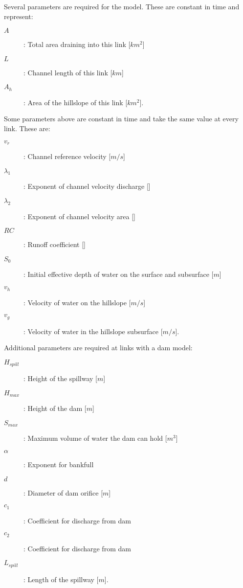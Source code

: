 \documentclass[12pt]{article}
\begin{document}
Several parameters are required for the model. These are constant in time and represent:
\begin{description}
 \item[$A$]: Total area draining into this link [$km^2$]
 \item[$L$]: Channel length of this link [$km$]
 \item[$A_h$]: Area of the hillslope of this link [$km^2$].
\end{description}
Some parameters above are constant in time and take the same value at every link. These are:
\begin{description}
 \item[$v_r$]: Channel reference velocity [$m/s$]
 \item[$\lambda_1$]: Exponent of channel velocity discharge []
 \item[$\lambda_2$]: Exponent of channel velocity area []
 \item[$RC$]: Runoff coefficient []
 \item[$S_0$]: Initial effective depth of water on the surface and subsurface [$m$]
 \item[$v_h$]: Velocity of water on the hillslope [$m/s$]
 \item[$v_g$]: Velocity of water in the hillslope subsurface [$m/s$].
\end{description}
Additional parameters are required at links with a dam model:
\begin{description}
 \item[$H_{spill}$]: Height of the spillway [$m$]
 \item[$H_{max}$]: Height of the dam [$m$]
 \item[$S_{max}$]: Maximum volume of water the dam can hold [$m^3$]
 \item[$\alpha$]: Exponent for bankfull
 \item[$d$]: Diameter of dam orifice [$m$]
 \item[$c_1$]: Coefficient for discharge from dam
 \item[$c_2$]: Coefficient for discharge from dam
 \item[$L_{spill}$]: Length of the spillway [$m$].
\end{description}
\end{document}
